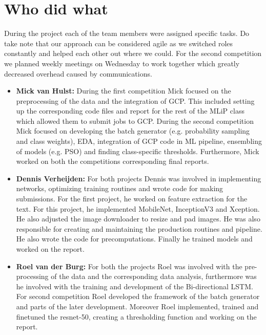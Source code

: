 \documentclass[twocolumn]{article}
\begin{document}



	    \section{Who did what}
	    	    
	    During the project each of the team members were assigned specific tasks. Do take note that our approach can be considered agile as we switched roles constantly and helped each other out where we could. For the second competition we planned weekly meetings on Wednesday to work together which greatly decreased overhead caused by communications.
	    \begin{itemize}
	        \item \textbf{Mick van Hulst:} During the first competition Mick focused on the preprocessing of the data and the integration of GCP. This included setting up the corresponding code files and report for the rest of the MLiP class which allowed them to submit jobs to GCP. During the second competition Mick focused on developing the batch generator (e.g. probability sampling and class weights), EDA, integration of GCP code in ML pipeline, ensembling of models (e.g. PSO) and finding class-specific thresholds. Furthermore, Mick worked on both the competitions corresponding final reports.
            
	        \item \textbf{Dennis Verheijden:} For both projects Dennis was involved in implementing networks, optimizing training routines and wrote code for making submissions. For the first project, he worked on feature extraction for the text. For this project, he implemented MobileNet, InceptionV3 and Xception. He also adjusted the image downloader to resize and pad images. He was also responsible for creating and maintaining the production routines and pipeline. He also wrote the code for precomputations. Finally he trained models and worked on the report.
            
	        \item \textbf{Roel van der Burg:} For both the projects Roel was involved with the pre-processing of the data and the corresponding data analysis, furthermore was he involved with the training and development of the Bi-directional LSTM. For second competition Roel developed the framework of the batch generator and parts of the later development. Moreover Roel implemented, trained and finetuned the resnet-50, creating a thresholding function and working on the report.		
            

\end{itemize}
\end{document}
